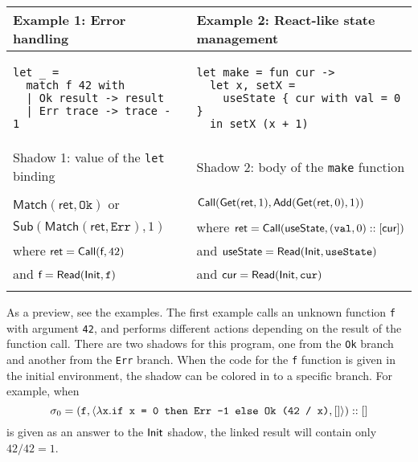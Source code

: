 \begin{center}
  \begin{tabular}{p{200pt}|p{200pt}}
    \hline
    Example 1: Error handling                                   & Example 2: React-like state management                                                                     \\
    \hline
    \begin{verbatim}
let _ =
  match f 42 with
  | Ok result -> result
  | Err trace -> trace - 1
\end{verbatim}
                                                                &
    \begin{verbatim}
let make = fun cur ->
  let x, setX =
    useState { cur with val = 0 }
  in setX (x + 1)
\end{verbatim}
    \\\hline
    Shadow 1: value of the \texttt{let} binding                 & Shadow 2: body of the \texttt{make} function
    \\\hline
    \\
    $\textsf{Match}(\textsf{ret},\texttt{Ok})$ or               & $\textsf{Call}(\textsf{Get}(\textsf{ret},1),\textsf{Add}(\textsf{Get}(\textsf{ret},0), 1))$ \\
    $\textsf{Sub}(\textsf{Match}(\textsf{ret},\texttt{Err}),1)$ & where $\textsf{ret}=\textsf{Call}(\textsf{useState},(\texttt{val},0)::[\textsf{cur}])$   \\
    where $\textsf{ret}=\textsf{Call}(\textsf{f},42)$                  & and $\textsf{useState}=\textsf{Read}(\textsf{Init},\texttt{useState})$                             \\
    and $\textsf{f}=\textsf{Read}(\textsf{Init},\texttt{f})$                  & and $\textsf{cur}=\textsf{Read}(\textsf{Init},\texttt{cur})$                                       \\
    \\\hline
  \end{tabular}
\end{center}

As a preview, see the examples.
The first example calls an unknown function \texttt{f} with argument \texttt{42}, and performs different actions depending on the result of the function call.
There are two shadows for this program, one from the \texttt{Ok} branch and another from the \texttt{Err} branch.
When the code for the \texttt{f} function is given in the initial environment, the shadow can be colored in to a specific branch.
For example, when
\[\sigma_0=(\texttt{f},\langle\lambda\texttt{x}.\texttt{if x = 0 then Err -1 else Ok (42 / x)},[]\rangle)::[]\]
is given as an answer to the $\textsf{Init}$ shadow, the linked result will contain only $42/42=1$.

